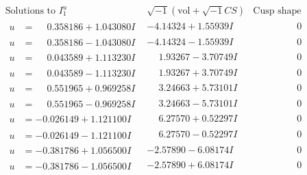 \documentclass[1p]{elsarticle_modified}
\theoremstyle{definition}
\newcommand{\I}{\sqrt{-1}}
\begin{document}
$$\begin{array}{c|c|c}
\text{Solutions to }I^u_{1}& \I (\text{vol} + \sqrt{-1}CS) & \text{Cusp shape}\\
 \hline 
\begin{aligned}
u &= \phantom{-}0.358186 + 1.043080 I\end{aligned}
 & -4.14324 + 1.55939 I & \phantom{-0.000000 } 0 \\ \hline\begin{aligned}
u &= \phantom{-}0.358186 - 1.043080 I\end{aligned}
 & -4.14324 - 1.55939 I & \phantom{-0.000000 } 0 \\ \hline\begin{aligned}
u &= \phantom{-}0.043589 + 1.113230 I\end{aligned}
 & \phantom{-}1.93267 - 3.70749 I & \phantom{-0.000000 } 0 \\ \hline\begin{aligned}
u &= \phantom{-}0.043589 - 1.113230 I\end{aligned}
 & \phantom{-}1.93267 + 3.70749 I & \phantom{-0.000000 } 0 \\ \hline\begin{aligned}
u &= \phantom{-}0.551965 + 0.969258 I\end{aligned}
 & \phantom{-}3.24663 + 5.73101 I & \phantom{-0.000000 } 0 \\ \hline\begin{aligned}
u &= \phantom{-}0.551965 - 0.969258 I\end{aligned}
 & \phantom{-}3.24663 - 5.73101 I & \phantom{-0.000000 } 0 \\ \hline\begin{aligned}
u &= -0.026149 + 1.121100 I\end{aligned}
 & \phantom{-}6.27570 + 0.52297 I & \phantom{-0.000000 } 0 \\ \hline\begin{aligned}
u &= -0.026149 - 1.121100 I\end{aligned}
 & \phantom{-}6.27570 - 0.52297 I & \phantom{-0.000000 } 0 \\ \hline\begin{aligned}
u &= -0.381786 + 1.056500 I\end{aligned}
 & -2.57890 - 6.08174 I & \phantom{-0.000000 } 0 \\ \hline\begin{aligned}
u &= -0.381786 - 1.056500 I\end{aligned}
 & -2.57890 + 6.08174 I & \phantom{-0.000000 } 0 \\ \hline\begin{aligned}

\end{aligned}
\end{array}$$
\end{document}
